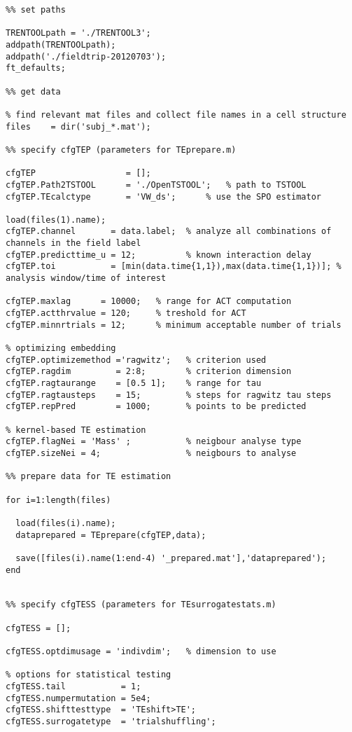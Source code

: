 \begin{lstlisting}
%% set paths

TRENTOOLpath = './TRENTOOL3';
addpath(TRENTOOLpath); 
addpath('./fieldtrip-20120703');
ft_defaults;

%% get data

% find relevant mat files and collect file names in a cell structure
files    = dir('subj_*.mat');

%% specify cfgTEP (parameters for TEprepare.m) 

cfgTEP                  = [];
cfgTEP.Path2TSTOOL      = './OpenTSTOOL';	% path to TSTOOL
cfgTEP.TEcalctype       = 'VW_ds'; 		% use the SPO estimator

load(files(1).name);
cfgTEP.channel       = data.label; 	% analyze all combinations of channels in the field label
cfgTEP.predicttime_u = 12;  		% known interaction delay
cfgTEP.toi  	     = [min(data.time{1,1}),max(data.time{1,1})]; % analysis window/time of interest

cfgTEP.maxlag      = 10000;   % range for ACT computation
cfgTEP.actthrvalue = 120;     % treshold for ACT 
cfgTEP.minnrtrials = 12;      % minimum acceptable number of trials

% optimizing embedding
cfgTEP.optimizemethod ='ragwitz';   % criterion used
cfgTEP.ragdim         = 2:8;        % criterion dimension
cfgTEP.ragtaurange    = [0.5 1];    % range for tau 
cfgTEP.ragtausteps    = 15;         % steps for ragwitz tau steps
cfgTEP.repPred        = 1000;       % points to be predicted

% kernel-based TE estimation
cfgTEP.flagNei = 'Mass' ;           % neigbour analyse type
cfgTEP.sizeNei = 4;                 % neigbours to analyse

%% prepare data for TE estimation

for i=1:length(files)

  load(files(i).name);
  dataprepared = TEprepare(cfgTEP,data);
  
  save([files(i).name(1:end-4) '_prepared.mat'],'dataprepared');
end


%% specify cfgTESS (parameters for TEsurrogatestats.m) 

cfgTESS = [];

cfgTESS.optdimusage = 'indivdim';   % dimension to use

% options for statistical testing
cfgTESS.tail           = 1;
cfgTESS.numpermutation = 5e4;
cfgTESS.shifttesttype  = 'TEshift>TE';
cfgTESS.surrogatetype  = 'trialshuffling';


\end{lstlisting}
